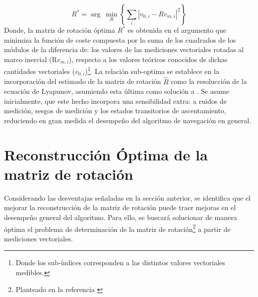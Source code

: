 \documentclass[conference]{IEEEtran}
\begin{document}
\begin{equation}\label{ProblemaOptimizacion}
R^*=\arg~\min_{R}\left\{\sum_i|v_{0,i}-Rv_{m,i}|^2\right\}
\end{equation}
Donde, la matriz de rotación óptima $R^*$ es obtenida en el argumento que minimiza la función de coste compuesta por la suma de los cuadrados de los módulos de la diferencia de: los valores de las mediciones vectoriales rotadas al marco inercial (R$v_{m,i}$), respecto a los valores teóricos conocidos de dichas cantidades vectoriales ($v_{0,i}$)\footnote{Donde los sub-índices corresponden a las distintos valores vectoriales medibles.}.
La relación sub-optima se establece en la incorporación del estimado de la matriz de rotación $\hat{R}$ como la resolucción de la ecuación de Lyapunov, asumiendo esta última como solución a \label{ProblemaOptimizacion}. Se asume inicialmente, que este hecho incorpora una sensibilidad extra: a ruidos de medición, sesgos de medición y los estados transitorios de ascentamiento, reduciendo en gran medida el desempeño del algoritmo de navegación en general. 
\section{Reconstrucción Óptima de la matriz de rotación}
Considerando las desventajas señaladas en la sección anterior, se identifica que el mejorar la reconstrucción de la matriz de rotación puede traer mejoras en el desempeño general del algoritmo. Para ello, se buscará solucionar de manera óptima el problema de determinación de la matriz de rotación\footnote{Planteado en la referencia \cite{Mahony2008}} a partir de mediciones vectoriales.
\end{document}

